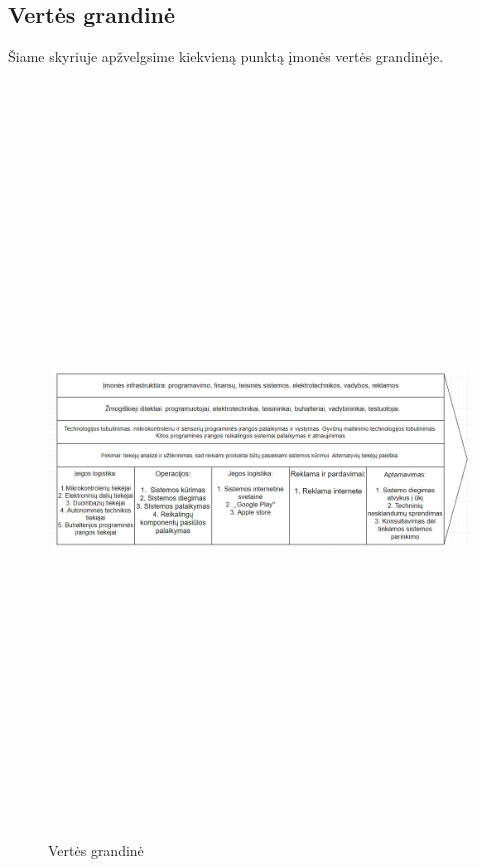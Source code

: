 \documentclass[oneside]{VUMIFPSkursinis}
\begin{document}
	\subsection{Vertės grandinė}
Šiame skyriuje apžvelgsime kiekvieną punktą įmonės vertės grandinėje.
\begin{figure}[H]
		\centering	
	\includegraphics[width=18cm,height=20cm,keepaspectratio]{ValueChain.png}
	\caption{Vertės grandinė}
	\label{fig:VertėsGrandinė}
\end{figure}
\end{document}
